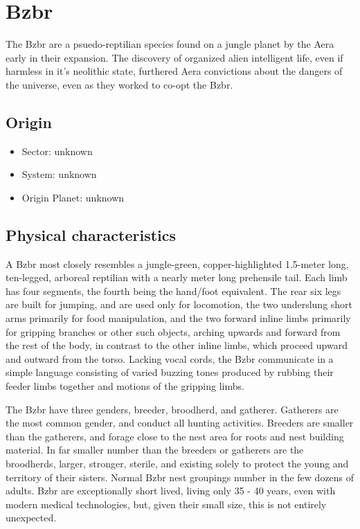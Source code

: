 \section{Bzbr}

The Bzbr are a psuedo-reptilian species found on a jungle planet by
the Aera early in their expansion. The discovery of organized alien
intelligent life, even if harmless in it's neolithic state, furthered
Aera convictions about the dangers of the universe, even as they
worked to co-opt the Bzbr.

\subsection{Origin}
\begin{itemize}
\item Sector: unknown
\item System: unknown
\item Origin Planet: unknown
\end{itemize}

\subsection{Physical characteristics}
A Bzbr most closely resembles a jungle-green, copper-highlighted
1.5-meter long, ten-legged, arboreal reptilian with a nearly meter
long prehensile tail. Each limb has four segments, the fourth being
the hand/foot equivalent. The rear six legs are built for jumping, and
are used only for locomotion, the two underslung short arms primarily
for food manipulation, and the two forward inline limbs primarily for
gripping branches or other such objects, arching upwards and forward
from the rest of the body, in contrast to the other inline limbs,
which proceed upward and outward from the torso. Lacking vocal cords,
the Bzbr communicate in a simple language consisting of varied buzzing
tones produced by rubbing their feeder limbs together and motions of
the gripping limbs.

The Bzbr have three genders, breeder, broodherd, and
gatherer. Gatherers are the most common gender, and conduct all
hunting activities. Breeders are smaller than the gatherers, and
forage close to the nest area for roots and nest building material. In
far smaller number than the breeders or gatherers are the broodherds,
larger, stronger, sterile, and existing solely to protect the young
and territory of their sisters. Normal Bzbr nest groupings number in
the few dozens of adults. Bzbr are exceptionally short lived, living
only 35 - 40 years, even with modern medical technologies, but, given
their small size, this is not entirely unexpected.

